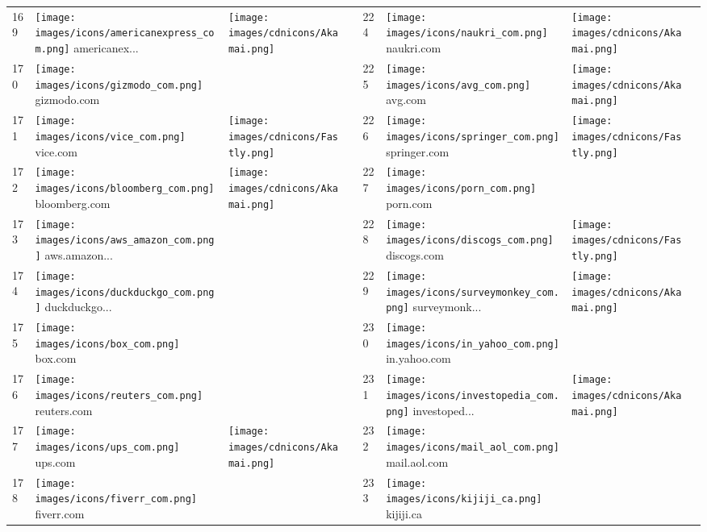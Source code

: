 \begin{table}[]
\begin{tabular}{|llll|llll|}
169 & \texttt{[image: images/icons/americanexpress\_com.png]} americanex... & \texttt{[image: images/cdnicons/Akamai.png]} & & 224 & \texttt{[image: images/icons/naukri\_com.png]} naukri.com & \texttt{[image: images/cdnicons/Akamai.png]} & \\
170 & \texttt{[image: images/icons/gizmodo\_com.png]} gizmodo.com & & & 225 & \texttt{[image: images/icons/avg\_com.png]} avg.com & \texttt{[image: images/cdnicons/Akamai.png]} & \\
171 & \texttt{[image: images/icons/vice\_com.png]} vice.com & \texttt{[image: images/cdnicons/Fastly.png]} & & 226 & \texttt{[image: images/icons/springer\_com.png]} springer.com & \texttt{[image: images/cdnicons/Fastly.png]} & \\
172 & \texttt{[image: images/icons/bloomberg\_com.png]} bloomberg.com & \texttt{[image: images/cdnicons/Akamai.png]} & & 227 & \texttt{[image: images/icons/porn\_com.png]} porn.com & & \\
173 & \texttt{[image: images/icons/aws\_amazon\_com.png]} aws.amazon... & & & 228 & \texttt{[image: images/icons/discogs\_com.png]} discogs.com & \texttt{[image: images/cdnicons/Fastly.png]} & \\
174 & \texttt{[image: images/icons/duckduckgo\_com.png]} duckduckgo... & & & 229 & \texttt{[image: images/icons/surveymonkey\_com.png]} surveymonk... & \texttt{[image: images/cdnicons/Akamai.png]} & \\
175 & \texttt{[image: images/icons/box\_com.png]} box.com & & & 230 & \texttt{[image: images/icons/in\_yahoo\_com.png]} in.yahoo.com & & \\
176 & \texttt{[image: images/icons/reuters\_com.png]} reuters.com & & & 231 & \texttt{[image: images/icons/investopedia\_com.png]} investoped... & \texttt{[image: images/cdnicons/Akamai.png]} & \\
177 & \texttt{[image: images/icons/ups\_com.png]} ups.com & \texttt{[image: images/cdnicons/Akamai.png]} & & 232 & \texttt{[image: images/icons/mail\_aol\_com.png]} mail.aol.com & & \\
178 & \texttt{[image: images/icons/fiverr\_com.png]} fiverr.com & & & 233 & \texttt{[image: images/icons/kijiji\_ca.png]} kijiji.ca & & \\

\end{tabular}
\end{table}
